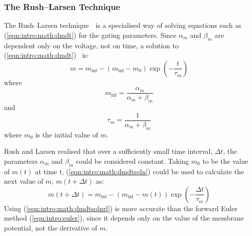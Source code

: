 \subsubsection{The Rush--Larsen Technique}

The Rush--Larsen technique~\cite{RL78}\ is a specialised way of solving
equations such as (\ref{eqn:intro:math:dmdt}) for the gating parameters.
Since $\alpha_m$ and $\beta_m$ are dependent only on the voltage, not on time, a
solution to (\ref{eqn:intro:math:dmdt})~\cite{Hodgkin1952} is:
\begin{equation}
\label{eqn:intro:math:dmdtsoln}
m = m_{\inf} - \left(m_{\inf} - m_0\right)\exp\left(-\frac{t}{\tau_m}\right)
\end{equation}
where
\begin{equation}
\label{eqn:intro:math:infm}
m_{\inf} = \frac{\alpha_{m}}{\alpha_{m} + \beta_{m}}
\end{equation}
and
\begin{equation}
\label{eqn:intro:math:taum}
\tau_m = \frac{1}{\alpha_{m} + \beta_{m}}
\end{equation}
where $m_0$ is the initial value of $m$.

Rush and Larsen realised that over a sufficiently small time interval, $\Delta t$,
the parameters $\alpha_m$ and $\beta_m$ could be considered constant.
Taking $m_0$ to be the value of $m(t)$ at time $t$, (\ref{eqn:intro:math:dmdtsoln})
could be used to calculate the next value of $m$, $m(t + \Delta t)$ as:
\begin{equation}
\label{eqn:intro:math:dmdtsolnrl}
m(t+ \Delta t) = m_{\inf} - \left(m_{\inf} - m(t)\right)\exp\left(-\frac{\Delta t}{\tau_m}\right)
\end{equation}
Using (\ref{eqn:intro:math:dmdtsolnrl}) is more accurate than the forward Euler
method (\ref{eqn:intro:euler}), since it depends only on the value of the
membrane potential, not the derivative of $m$.

